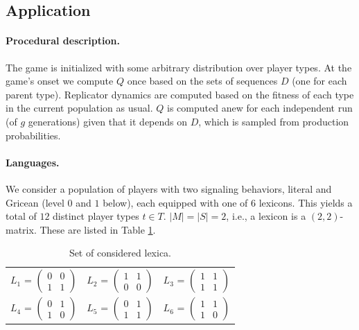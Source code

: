 \documentclass[a4paper]{article}
\begin{document}
\subsection{Application}




\paragraph{Procedural description.} The game is initialized with some arbitrary distribution over player types. At the game's onset we compute $Q$ once based on the sets  of sequences $D$ (one for each parent type). Replicator dynamics are computed based on the fitness of each type in the current population as usual. $Q$ is computed anew for each independent run (of $g$ generations) given that it depends on $D$, which is sampled from production probabilities.


\paragraph{Languages.} We consider a population of players with two signaling behaviors, literal and Gricean (level $0$ and $1$ below), each equipped with one of $6$ lexicons. This yields a total of $12$ distinct player types $t \in T$. $|M| = |S| = 2$, i.e., a lexicon is a $(2,2)$-matrix. These are listed in Table \ref{tab:lexica}. 

\begin{table}[h]
\centering 
\begin{tabular}{l c l}
$L_1$ = $\begin{pmatrix} 0 & 0 \\ 1 & 1 \end{pmatrix}$ & 
$L_2$ = $\begin{pmatrix} 1 & 1 \\ 0 & 0 \end{pmatrix}$ & 
$L_3$ = $\begin{pmatrix} 1 & 1 \\ 1 & 1 \end{pmatrix}$\\[0.5cm]

$L_4$ = $\begin{pmatrix} 0 & 1 \\ 1 & 0 \end{pmatrix}$ &
$L_5$ = $\begin{pmatrix} 0 & 1 \\ 1 & 1 \end{pmatrix}$ &
$L_6$ = $\begin{pmatrix} 1 & 1 \\ 1 & 0 \end{pmatrix}$
\end{tabular}
\caption{{\footnotesize Set of considered lexica.}}
\label{tab:lexica}
\end{table}
\end{document}
